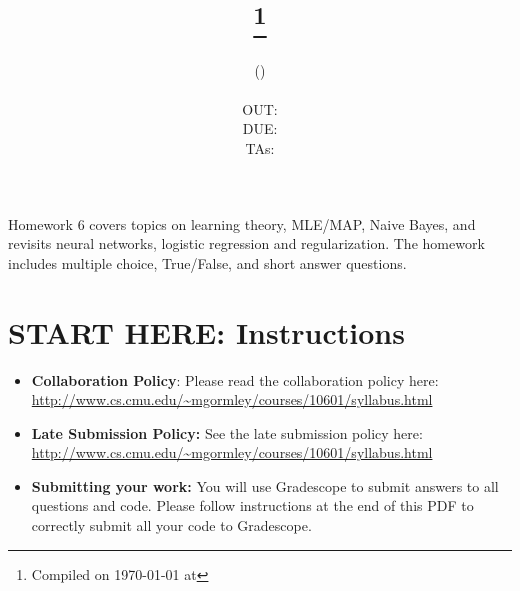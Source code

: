 \documentclass[11pt,addpoints,answers]{exam}
\title{\textsc{\hwNum}\\
\textsc{\hwTopic}
\thanks{Compiled on \today{} at \currenttime{}}\\
\vspace{1em}
} %
\author{\textsc{\large \courseNum{} \courseName{} (\courseSem)}\\
\courseUrl
\vspace{1em}\\
  OUT: \outDate \\
  DUE: \dueDate \\
  TAs: \taNames\\
}
\date{}
\date{}
\begin{document}
\maketitle

\begin{notebox}
Homework 6 covers topics on learning theory, MLE/MAP, Naive Bayes, and revisits neural networks, logistic regression and regularization. The homework includes multiple choice, True/False, and short answer questions. 
\end{notebox}
\newcommand \maxsubs {10 }
\section*{START HERE: Instructions}
\begin{itemize}

\item \textbf{Collaboration Policy}: Please read the collaboration policy here: \url{http://www.cs.cmu.edu/~mgormley/courses/10601/syllabus.html}

\item\textbf{Late Submission Policy:} See the late submission policy here: \url{http://www.cs.cmu.edu/~mgormley/courses/10601/syllabus.html}

\item\textbf{Submitting your work:} You will use Gradescope to submit
  answers to all questions and code. Please
  follow instructions at the end of this PDF to correctly submit all your code to Gradescope.

  \begin{itemize}
    

    

\end{itemize}
\end{itemize}
\end{document}
